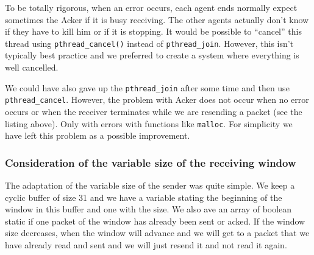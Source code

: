 \documentclass[10pt,a4paper]{article}
\begin{document}
To be totally rigorous, when an error occurs, each agent ends normally expect sometimes the Acker if it is busy receiving. The other agents actually don't know if they have to kill him or if it is stopping. It would be possible to ``cancel'' this thread using \lstinline|pthread_cancel()| instead of \lstinline|pthread_join|. However, this isn't typically best practice and we preferred to create a system where everything is well cancelled.

We could have also gave up the \lstinline|pthread_join| after some time and then use \lstinline|pthread_cancel|.
However, the problem with Acker does not occur when no error occurs or when the receiver terminates while we are resending a packet (see the listing above).
Only with errors with functions like \lstinline|malloc|. For simplicity we have left this problem as a possible improvement.

\subsubsection{Consideration of the variable size of the receiving window}
The adaptation of the variable size of the sender was quite simple.
We keep a cyclic buffer of size 31 and we have a variable stating the beginning of the window in this buffer and one with the size.
We also ave an array of boolean static if one packet of the window has already been sent or acked.
If the window size decreases, when the window will advance and we will get to a packet that we have already read and sent and we will just resend it and not read it again.
\end{document}
